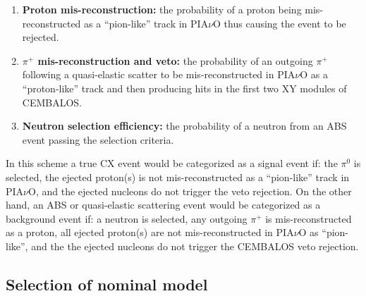 \begin{enumerate}
\item{{\bf Proton mis-reconstruction:} the probability of a proton being mis-reconstructed as a ``pion-like'' track in PIA$\nu$O thus causing the event to be rejected.}

\item{{\bf $\pi^{+}$ mis-reconstruction and veto:} the probability of an outgoing $\pi^{+}$ following a quasi-elastic scatter to be mis-reconstructed in PIA$\nu$O as a ``proton-like'' track and then producing hits in the first two XY modules of CEMBALOS.}

\item{{\bf Neutron selection efficiency:} the probability of a neutron from an ABS event passing the selection criteria.}
\end{enumerate}

In this scheme a true CX event would be categorized as a signal event if: the $\pi^{0}$ is selected, the ejected proton(s) is not mis-reconstructed as a ``pion-like'' track in PIA$\nu$O, and the ejected nucleons do not trigger the veto rejection. On the other hand, an ABS or quasi-elastic scattering event would be categorized as a background event if: a neutron is selected, any outgoing $\pi^{+}$ is mis-reconstructed as a proton, all ejected proton(s) are not mis-reconstructed in PIA$\nu$O as ``pion-like'', and the the ejected nucleons do not trigger the CEMBALOS veto rejection. 

\subsection{Selection of nominal model}\label{sec:nominal}

